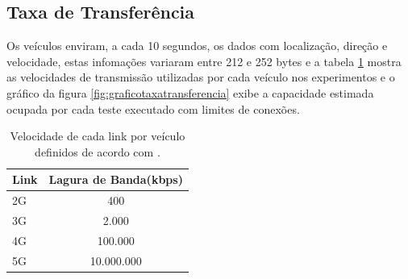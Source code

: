 \documentclass[
	12pt,				%
	oneside,			%
	a4paper,			%
	english,			%
	brazil				%
	]{abntex2ppgsi}
\begin{document}
\subsection{Taxa de Transferência}

Os veículos enviram, a cada 10 segundos, os dados com localização, direção e velocidade, estas infomações variaram entre 212 e 252 bytes e a tabela \ref{tbLink} mostra as velocidades de transmissão utilizadas por cada veículo nos experimentos e o gráfico da figura \ref{fig:graficotaxatransferencia} exibe a capacidade estimada ocupada por cada teste executado com limites de conexões. 

\begin{table}[!h]
	\centering
	\caption{Velocidade de cada link por veículo definidos de acordo com .}
	\label{tbLink}
	\begin{tabular}{|l | c | }
		\hline
		\rowcolor[gray]{0.7}
		Link & Lagura de Banda(kbps)           \\ \hline
		\cellcolor[gray]{0.7}2G              & 400  \\ \hline
		\cellcolor[gray]{0.7}3G             & 2.000    \\ \hline
		\cellcolor[gray]{0.7}4G             & 100.000    \\ \hline
		\cellcolor[gray]{0.7}5G             & 10.000.000    \\ \hline
	\end{tabular}
\end{table}


\end{document}
